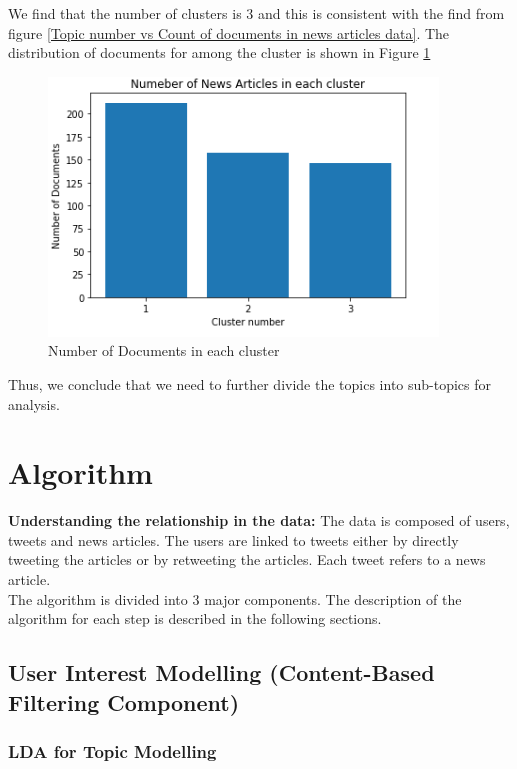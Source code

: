 \documentclass{article}
\begin{document}
We find that the number of clusters is 3 and this is consistent with the find from figure \ref{Topic number vs Count of documents in news articles data}. The distribution of documents for among the cluster  is shown in Figure \ref{Number of Documents in each cluster}
\begin{figure}
    \centering
    \includegraphics{cluster.PNG}
    \caption{Number of Documents in each cluster}
    \label{Number of Documents in each cluster}
\end{figure}



Thus, we conclude that we need to further divide the topics into sub-topics for analysis.


\section{Algorithm}

\textbf{Understanding the relationship in the data:} The data is composed of users, tweets and news articles. The users are linked to tweets either by directly tweeting the articles or by retweeting the articles. Each tweet refers to a news article. \\

The algorithm is divided into 3 major components. The description of the algorithm for each step is described in the following sections. \\

\subsection{User Interest Modelling (Content-Based Filtering Component)}

\subsubsection{LDA for Topic Modelling}
\end{document}

